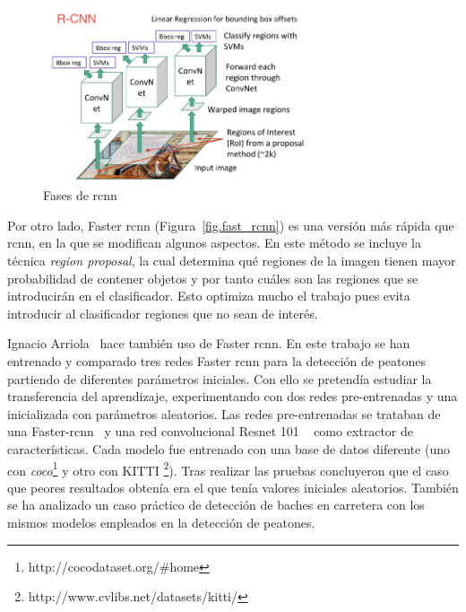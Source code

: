 \begin{figure}[H]
  \begin{center}
    \includegraphics[width=0.7\textwidth]{figures/estado_arte/rcnn.png}
		\caption{Fases de \acrshort{rcnn}}
		\label{fig.rcnn}
		\end{center}
\end{figure}

Por otro lado, Faster \acrshort{rcnn} (Figura~\ref{fig.fast_rcnn}) es una versión más rápida que \acrshort{rcnn}, en la que se modifican algunos aspectos. En este método se incluye la técnica \textit{region proposal}, la cual determina qué regiones de la imagen tienen mayor probabilidad de contener objetos y por tanto cuáles son las regiones que se introducirán en el clasificador. Esto optimiza mucho el trabajo pues evita introducir al clasificador regiones que no sean de interés.


Ignacio Arriola~\cite{tesis_ignacio_arriola} hace también uso de Faster \acrshort{rcnn}. En este trabajo se han entrenado y comparado tres redes Faster \acrshort{rcnn} para la detección de peatones partiendo de diferentes parámetros iniciales. Con ello se pretendía estudiar la transferencia del aprendizaje, experimentando con dos redes pre-entrenadas y una inicializada con parámetros aleatorios.  Las redes pre-entrenadas se trataban de una Faster-\acrshort{rcnn}~\cite{faster_rcnn_ignacio} y una red convolucional Resnet 101 ~\cite{faster_rcnn_regnet_ignacio} como extractor de características. Cada modelo fue entrenado con una base de datos diferente (uno con \textit{\acrfull{coco}}\footnote{http://cocodataset.org/\#home} y otro con KITTI \footnote{http://www.cvlibs.net/datasets/kitti/}). Tras realizar las pruebas concluyeron que el caso que peores resultados obtenía era el que tenía valores iniciales aleatorios. También se ha analizado un caso práctico de detección de baches en carretera con los mismos modelos empleados en la detección de peatones.

